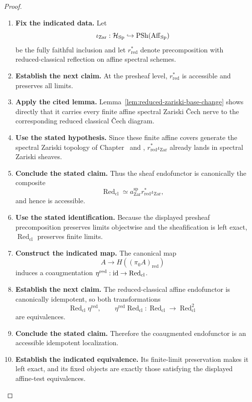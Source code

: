 \begin{proof}
\leavevmode
\begin{enumerate}[label=\textup{(\arabic*)}]
    \item \textbf{Fix the indicated data.}
    Let
    \[
    \iota_{\mathrm{Zar}}:
    \mathcal H_{\operatorname{Sp}}
    \hookrightarrow
    \operatorname{PSh}(\operatorname{Aff}_{\operatorname{Sp}})
    \]
    be the fully faithful inclusion and let \(r_{\mathrm{red}}^*\) denote precomposition with
    reduced-classical reflection on affine spectral schemes.
    \item \textbf{Establish the next claim.}
    At the presheaf level, \(r_{\mathrm{red}}^*\) is
    accessible and preserves all limits.
    \item \textbf{Apply the cited lemma.}
    Lemma~\ref{lem:reduced-zariski-base-change}
    shows directly that it carries every finite affine spectral Zariski \v{C}ech
    nerve to the corresponding reduced classical \v{C}ech diagram.
    \item \textbf{Use the stated hypothesis.}
    Since these
    finite affine covers generate the spectral Zariski topology of
    Chapter~ and \cite{LurieSAG},
    \(r_{\mathrm{red}}^*\iota_{\mathrm{Zar}}\) already lands in spectral Zariski
    sheaves.
    \item \textbf{Conclude the stated claim.}
    Thus the sheaf endofunctor is canonically the
    composite
    \[
    \operatorname{Red}_{\mathrm{cl}}
    \simeq
    a^{\mathrm{sp}}_{\mathrm{Zar}}
    r_{\mathrm{red}}^*\iota_{\mathrm{Zar}},
    \]
    and hence is accessible.
    \item \textbf{Use the stated identification.}
    Because the displayed presheaf precomposition preserves
    limits objectwise and the sheafification is left exact, \(\operatorname{Red}_{\mathrm{cl}}\)
    preserves finite limits.
    \item \textbf{Construct the indicated map.}
    The canonical map
    \[
    A\longrightarrow H((\pi_0A)_{\mathrm{red}})
    \]
    induces a coaugmentation \(\eta^{\mathrm{red}}:\operatorname{id}\to \operatorname{Red}_{\mathrm{cl}}\).
    \item \textbf{Establish the next claim.}
    The reduced-classical
    affine endofunctor is canonically idempotent, so both transformations
    \[
    \operatorname{Red}_{\mathrm{cl}}\eta^{\mathrm{red}},
    \qquad
    \eta^{\mathrm{red}}\operatorname{Red}_{\mathrm{cl}}:
    \operatorname{Red}_{\mathrm{cl}}\longrightarrow \operatorname{Red}_{\mathrm{cl}}^2
    \]
    are equivalences.
    \item \textbf{Conclude the stated claim.}
    Therefore the coaugmented endofunctor is an accessible
    idempotent localization.
    \item \textbf{Establish the indicated equivalence.}
    Its finite-limit preservation makes it left exact, and
    its fixed objects are exactly those satisfying the displayed affine-test
    equivalences.
\end{enumerate}
\end{proof}

